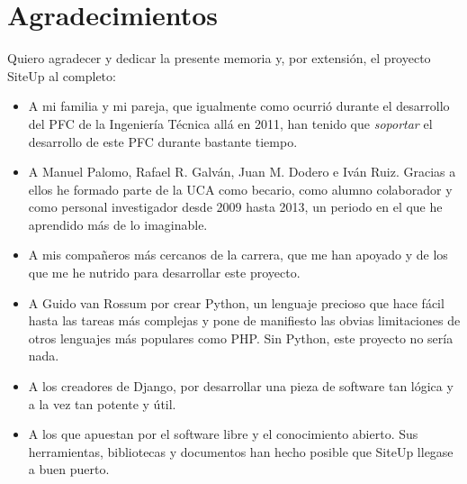 \section*{Agradecimientos}
Quiero agradecer y dedicar la presente memoria y, por extensión, el proyecto
SiteUp al completo:

\begin{itemize}
\item A mi familia y mi pareja, que igualmente como ocurrió durante el
  desarrollo del PFC de la Ingeniería Técnica allá en 2011, han tenido que
  \textit{soportar} el desarrollo de este PFC durante bastante tiempo.

\item A Manuel Palomo, Rafael R. Galván, Juan M. Dodero e Iván Ruiz. Gracias a
  ellos he formado parte de la UCA como becario, como alumno colaborador y como
  personal investigador desde 2009 hasta 2013, un periodo en el que he aprendido
  más de lo imaginable.
 
\item A mis compañeros más cercanos de la carrera, que me han apoyado y de los
  que me he nutrido para desarrollar este proyecto.

\item A Guido van Rossum por crear Python, un lenguaje precioso que hace fácil
  hasta las tareas más complejas y pone de manifiesto las obvias limitaciones de
  otros lenguajes más populares como PHP. Sin Python, este proyecto no sería nada.

\item A los creadores de Django, por desarrollar una pieza de software tan
  lógica y a la vez tan potente y útil. 

\item A los que apuestan por el software libre y el conocimiento abierto. Sus
  herramientas, bibliotecas y documentos han hecho posible que SiteUp llegase a
  buen puerto.
\end{itemize}

